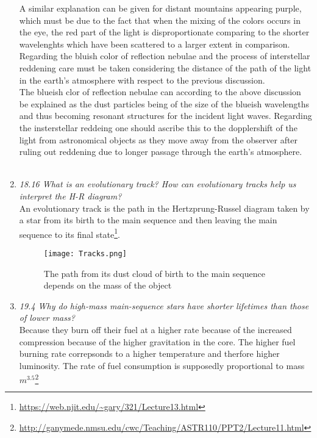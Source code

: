 \documentclass[./exercises.tex]{subfiles}
\begin{document}
\begin{enumerate}
A similar explanation can be given for distant mountains appearing purple, 
which must be due to the fact that when the mixing of the colors occurs
in the eye, the red part of the light is disproportionate comparing to
the shorter wavelenghts which have been scattered to a larger extent in comparison.\\

Regarding the bluish color of reflection nebulae and 
the process of interstellar reddening care must be taken considering the distance of the path
of the light in the earth's atmosphere with respect to the previous discussion.\\ 
The blueish clor of reflection nebulae can according to the above discussion be explained
as the dust particles being of the size of the blueish wavelengths and thus becoming resonant
structures for the incident light waves.
Regarding the insterstellar reddeing one should
ascribe this to the dopplershift of the light from astronomical objects as they move away from
the observer after ruling out reddening due to longer passage through the earth's atmosphere.\\
\\





\item\textit{18.16 What is an evolutionary track?
 How can evolutionary tracks help us interpret the H-R diagram?}\\

An evolutionary track is the path in the Hertzprung-Russel diagram
taken by a star from its birth to the main sequence and then leaving the main sequence
to its final state\footnote{\url{https://web.njit.edu/~gary/321/Lecture13.html}}.

\begin{figure}[H]
  \centering
  \texttt{[image: Tracks.png]}
  \caption{The path from its dust cloud of birth to the main sequence depends on the mass of the object}
  \label{fig:fig3}
\end{figure}

\item\textit{19.4 Why do high-mass main-sequence stars have shorter lifetimes than those of lower 
mass?}\\

Because they burn off their fuel at a higher rate because of the increased compression
because of the higher gravitation in the core. The higher fuel burning rate
correpsonds to a higher temperature and therfore higher luminosity.
The rate of fuel consumption is supposedly proportional to mass $m^{3.5}$\footnote{\url{http://ganymede.nmsu.edu/cwc/Teaching/ASTR110/PPT2/Lecture11.html}}
 

\end{enumerate}
\end{document}
